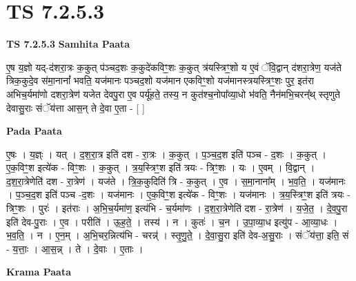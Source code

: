 \documentclass[17pt]{extarticle}
\begin{document}
\section{ TS 7.2.5.3 }

\textbf{TS 7.2.5.3 } \newline
\textbf{Samhita Paata} \newline

ए॒ष य॒ज्ञो यद्-द॑शरा॒त्रः क॒कुत् प॑ञ्चद॒शः क॒कुदे॑कविꣳ॒॒शः क॒कुत् त्र॑यस्त्रिꣳ॒॒शो य ए॒वं ॅवि॒द्वान् द॑शरा॒त्रेण॒ यज॑ते त्रिक॒कुदे॒व स॑मा॒नानां᳚ भवति॒ यज॑मानः पञ्चद॒शो यज॑मान एकविꣳ॒॒शो यज॑मानस्त्रयस्त्रिꣳ॒॒शः पुर॒ इत॑रा अभिच॒र्यमा॑णो दशरा॒त्रेण॑ यजेत देवपु॒रा ए॒व पर्यू॑हते॒ तस्य॒ न कुत॑श्च॒नोपा᳚व्या॒धो भ॑वति॒ नैन॑मभि॒चरन्᳚थ् स्तृणुते देवासु॒राः संॅय॑त्ता आस॒न् ते दे॒वा ए॒ता - [  ] \newline

\textbf{Pada Paata} \newline

ए॒षः । य॒ज्ञ्ः । यत् । द॒श॒रा॒त्र इति॑ दश - रा॒त्रः । क॒कुत् । प॒ञ्च॒द॒श इति॑ पञ्च - द॒शः । क॒कुत् । ए॒क॒विꣳ॒॒श इत्ये॑क - विꣳ॒॒शः । क॒कुत् । त्र॒य॒स्त्रिꣳ॒॒श इति॑ त्रयः - त्रिꣳ॒॒शः । यः । ए॒वम् । वि॒द्वान् । द॒श॒रा॒त्रेणेति॑ दश - रा॒त्रेण॑ । यज॑ते । त्रि॒क॒कुदिति॑ त्रि - क॒कुत् । ए॒व । स॒मा॒नाना᳚म् । भ॒व॒ति॒ । यज॑मानः । प॒ञ्च॒द॒श इति॑ पञ्च -द॒शः । यज॑मानः । ए॒क॒विꣳ॒॒श इत्ये॑क - विꣳ॒॒शः । यज॑मानः । त्र॒य॒स्त्रिꣳ॒॒श इति॑ त्रयः - त्रिꣳ॒॒शः । पुरः॑ । इत॑राः । अ॒भि॒च॒र्यमा॑ण॒ इत्य॑भि - च॒र्यमा॑णः । द॒श॒रा॒त्रेणेति॑ दश - रा॒त्रेण॑ । य॒जे॒त॒ । दे॒व॒पु॒रा इति॑ देव-पु॒राः । ए॒व । परीति॑ । ऊ॒ह॒ते॒ । तस्य॑ । न । कुतः॑ । च॒न । उ॒पा॒व्या॒ध इत्यु॑प - आ॒व्या॒धः । भ॒व॒ति॒ । न । ए॒न॒म् । अ॒भि॒चर॒न्नित्य॑भि - चरन्न्॑ । स्तृ॒णु॒ते॒ । दे॒वा॒सु॒रा इति॑ देव-अ॒सु॒राः । संॅय॑त्ता॒ इति॒ सं - य॒त्ताः॒ । आ॒स॒न्न् । ते । दे॒वाः । ए॒ताः ।  \newline


\textbf{Krama Paata} \newline
\end{document}
